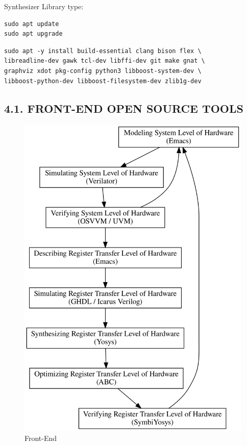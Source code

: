 \documentclass[
]{article}
\begin{document}
Synthesizer Library type:

\begin{verbatim}
sudo apt update
sudo apt upgrade
\end{verbatim}

\begin{verbatim}
sudo apt -y install build-essential clang bison flex \
libreadline-dev gawk tcl-dev libffi-dev git make gnat \
graphviz xdot pkg-config python3 libboost-system-dev \
libboost-python-dev libboost-filesystem-dev zlib1g-dev
\end{verbatim}

\hypertarget{front-end-open-source-tools-2}{%
\subsection{4.1. FRONT-END OPEN SOURCE
TOOLS}\label{front-end-open-source-tools-2}}

\begin{figure}
\centering
\includegraphics{../doc/front-end.svg}
\caption{Front-End}
\end{figure}
\end{document}
